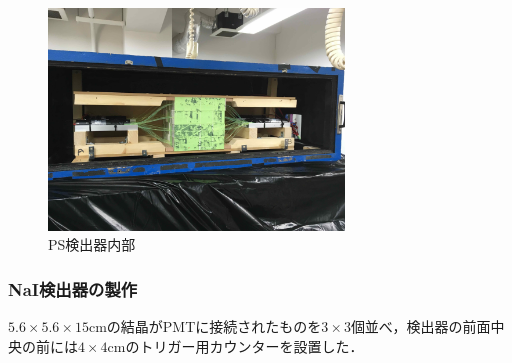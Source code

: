 \begin{figure}[H]
  \centering
  \includegraphics[width=0.7\textwidth]{figure/hayakawa/PS_in.jpg}
  \caption{PS検出器内部}
\end{figure}




\subsubsection{NaI検出器の製作}
$5.6\times 5.6\times 15\mathrm{cm}$の結晶がPMTに接続されたものを$3\times 3$個並べ，検出器の前面中央の前には$4\times 4\mathrm{cm}$のトリガー用カウンターを設置した．

